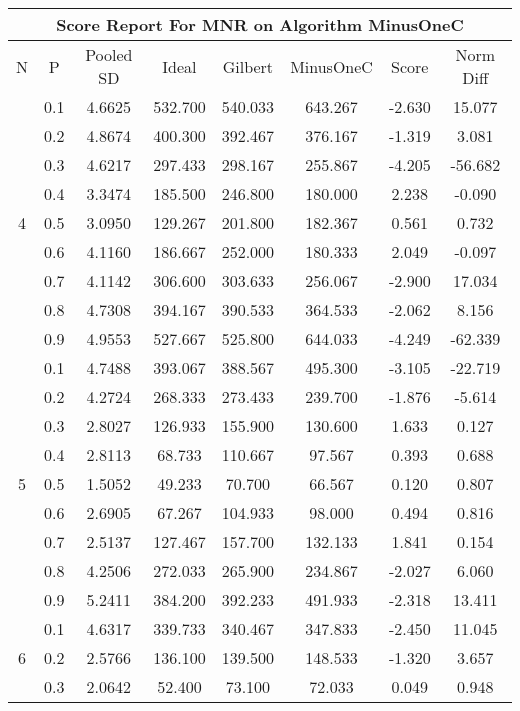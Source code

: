 \documentclass[11pt,a4paper]{report}
\begin{document}
\begin{longtable}{ | c | c || c | c | c | c | c | c | }
\hline
\multicolumn{8}{|c|}{ Score Report For MNR on Algorithm MinusOneC} \\
\hline
N & P & Pooled SD &  Ideal &  Gilbert & MinusOneC  & Score & Norm Diff \\
 \hline
 \hline
 \endhead
\multirow{9}{*}{4} & 0.1 & 4.6625 & 532.700 & 540.033 & 643.267 & -2.630 & 15.077 \\
 & 0.2 & 4.8674 & 400.300 & 392.467 & 376.167 & -1.319 & 3.081 \\
 & 0.3 & 4.6217 & 297.433 & 298.167 & 255.867 & -4.205 & -56.682 \\
 & 0.4 & 3.3474 & 185.500 & 246.800 & 180.000 & 2.238 & -0.090 \\
 & 0.5 & 3.0950 & 129.267 & 201.800 & 182.367 & 0.561 & 0.732 \\
 & 0.6 & 4.1160 & 186.667 & 252.000 & 180.333 & 2.049 & -0.097 \\
 & 0.7 & 4.1142 & 306.600 & 303.633 & 256.067 & -2.900 & 17.034 \\
 & 0.8 & 4.7308 & 394.167 & 390.533 & 364.533 & -2.062 & 8.156 \\
 & 0.9 & 4.9553 & 527.667 & 525.800 & 644.033 & -4.249 & -62.339 \\
 \hline
\multirow{9}{*}{5} & 0.1 & 4.7488 & 393.067 & 388.567 & 495.300 & -3.105 & -22.719 \\
 & 0.2 & 4.2724 & 268.333 & 273.433 & 239.700 & -1.876 & -5.614 \\
 & 0.3 & 2.8027 & 126.933 & 155.900 & 130.600 & 1.633 & 0.127 \\
 & 0.4 & 2.8113 & 68.733 & 110.667 & 97.567 & 0.393 & 0.688 \\
 & 0.5 & 1.5052 & 49.233 & 70.700 & 66.567 & 0.120 & 0.807 \\
 & 0.6 & 2.6905 & 67.267 & 104.933 & 98.000 & 0.494 & 0.816 \\
 & 0.7 & 2.5137 & 127.467 & 157.700 & 132.133 & 1.841 & 0.154 \\
 & 0.8 & 4.2506 & 272.033 & 265.900 & 234.867 & -2.027 & 6.060 \\
 & 0.9 & 5.2411 & 384.200 & 392.233 & 491.933 & -2.318 & 13.411 \\
 \hline
\multirow{9}{*}{6} & 0.1 & 4.6317 & 339.733 & 340.467 & 347.833 & -2.450 & 11.045 \\
 & 0.2 & 2.5766 & 136.100 & 139.500 & 148.533 & -1.320 & 3.657 \\
 & 0.3 & 2.0642 & 52.400 & 73.100 & 72.033 & 0.049 & 0.948 \\

\end{longtable}
\end{document}

